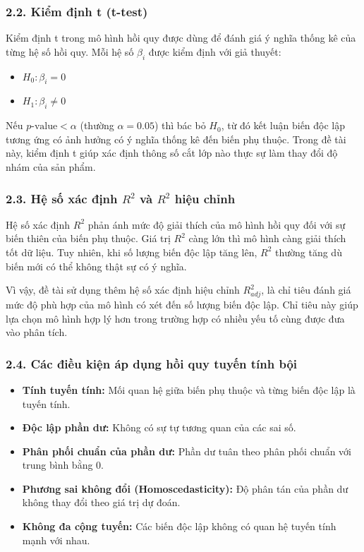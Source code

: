 \subsubsection{2.2. Kiểm định t (t-test)}
Kiểm định t trong mô hình hồi quy được dùng để đánh giá ý nghĩa thống kê của từng hệ số hồi quy. Mỗi hệ số $\beta_i$ được kiểm định với giả thuyết:
\begin{itemize}
    \item $H_0: \beta_i = 0$
    \item $H_1: \beta_i \neq 0$
\end{itemize}
Nếu $p\text{-value} < \alpha$ (thường $\alpha = 0.05$) thì bác bỏ $H_0$, từ đó kết luận biến độc lập tương ứng có ảnh hưởng có ý nghĩa thống kê đến biến phụ thuộc. Trong đề tài này, kiểm định t giúp xác định thông số cắt lớp nào thực sự làm thay đổi độ nhám của sản phẩm.

\subsubsection{2.3. Hệ số xác định $R^2$ và $R^2$ hiệu chỉnh}
Hệ số xác định $R^2$ phản ánh mức độ giải thích của mô hình hồi quy đối với sự biến thiên của biến phụ thuộc. Giá trị $R^2$ càng lớn thì mô hình càng giải thích tốt dữ liệu. Tuy nhiên, khi số lượng biến độc lập tăng lên, $R^2$ thường tăng dù biến mới có thể không thật sự có ý nghĩa.

Vì vậy, đề tài sử dụng thêm hệ số xác định hiệu chỉnh $R_{adj}^2$, là chỉ tiêu đánh giá mức độ phù hợp của mô hình có xét đến số lượng biến độc lập. Chỉ tiêu này giúp lựa chọn mô hình hợp lý hơn trong trường hợp có nhiều yếu tố cùng được đưa vào phân tích.

\subsubsection{2.4. Các điều kiện áp dụng hồi quy tuyến tính bội}
\begin{itemize}
    \item \textbf{Tính tuyến tính:} Mối quan hệ giữa biến phụ thuộc và từng biến độc lập là tuyến tính.
    \item \textbf{Độc lập phần dư:} Không có sự tự tương quan của các sai số.
    \item \textbf{Phân phối chuẩn của phần dư:} Phần dư tuân theo phân phối chuẩn với trung bình bằng 0.
    \item \textbf{Phương sai không đổi (Homoscedasticity):} Độ phân tán của phần dư không thay đổi theo giá trị dự đoán.
    \item \textbf{Không đa cộng tuyến:} Các biến độc lập không có quan hệ tuyến tính mạnh với nhau.
\end{itemize}

